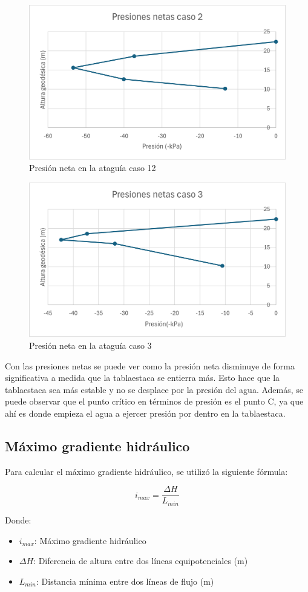 \documentclass{article}
\begin{document}
\begin{figure}[h!]
  \centering
  \includegraphics[width=0.55\linewidth]{graficos/grafico_presiones_2.png}
  \caption{Presión neta en la ataguía caso 12}
  \label{fig:presion_neta2}
\end{figure}

\newpage

\begin{figure}[h!]
  \centering
  \includegraphics[width=0.55\linewidth]{graficos/grafico_presiones_3.png}
  \caption{Presión neta en la ataguía caso 3}
  \label{fig:presion_neta3}
\end{figure}


Con las presiones netas se puede ver como la presión neta disminuye de forma significativa a medida que la tablaestaca se entierra más. Esto hace que la tablaestaca sea más estable y no se desplace por la presión del agua. Además, se puede observar que el punto crítico en términos de presión es el punto C, ya que ahí es donde empieza el agua a ejercer presión por dentro en la tablaestaca.


\subsection{Máximo gradiente hidráulico}

Para calcular el máximo gradiente hidráulico, se utilizó la siguiente fórmula:

\begin{equation}
  i_{max} = \frac{\Delta H}{L_{min}}
\end{equation}

Donde:
\begin{itemize}
    \item $i_{max}$: Máximo gradiente hidráulico 
    \item $\Delta H$: Diferencia de altura entre dos líneas equipotenciales (m)
    \item $L_{min}$: Distancia mínima entre dos líneas de flujo (m)
\end{itemize}
\end{document}
